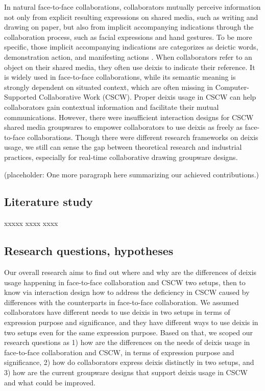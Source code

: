 \documentclass[12pt,twoside]{article}
\begin{document}


In natural face-to-face collaborations, collaborators mutually perceive information not only from explicit resulting expressions on shared media, such as writing and drawing on paper, but also from implicit accompanying indications through the collaboration process, such as facial expressions and hand gestures. To be more specific, those implicit accompanying indications are categorizes as deictic words, demonstration action, and manifesting actions \cite{gutwin2002descriptive}. When collaborators refer to an object on their shared media, they often use deixis to indicate their reference. It is widely used in face-to-face collaborations, while its semantic meaning is strongly dependent on situated context, which are often missing in Computer-Supported Collaborative Work (CSCW). Proper deixis usage in CSCW can help collaborators gain contextual information and facilitate their mutual communications. However, there were insufficient interaction designs for CSCW shared media groupwares to empower collaborators to use deixis as freely as face-to-face collaborations. Though there were different research frameworks on deixis usage, we still can sense the gap between theoretical research and industrial practices, especially for real-time collaborative drawing groupware designs.

(placeholder: One more paragraph here summarizing our achieved contributions.)

\subsection{Literature study}
\label{sect:literature}

xxxxx xxxx xxxx 

\subsection{Research questions, hypotheses}
\label{sect:questions}

Our overall research aims to find out where and why are the differences of deixis usage happening in face-to-face collaboration and CSCW two setups, then to know via interaction design how to address the deficiency in CSCW caused by differences with the counterparts in face-to-face collaboration. We assumed collaborators have different needs to use deixis in two setups in terms of expression purpose and significance, and they have different ways to use deixis in two setups even for the same expression purpose. Based on that, we scoped our research questions as 1) how are the differences on the needs of deixis usage in face-to-face collaboration and CSCW, in terms of expression purpose and significance, 2) how do collaborators express deixis distinctly in two setups, and 3) how are the current groupware designs that support deixis usage in CSCW and what could be improved. 
\end{document}
